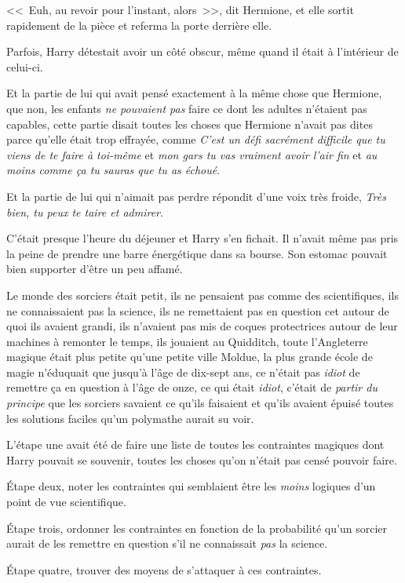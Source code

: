 <<~Euh, au revoir pour l'instant, alors~>>, dit Hermione, et elle sortit rapidement de la pièce et referma la porte derrière elle.

Parfois, Harry détestait avoir un côté obscur, même quand il était à l'intérieur de celui-ci.

Et la partie de lui qui avait pensé exactement à la même chose que Hermione, que non, les enfants \emph{ne pouvaient pas} faire ce dont les adultes n'étaient pas capables, cette partie disait toutes les choses que Hermione n'avait pas dites parce qu'elle était trop effrayée, comme \emph{C'est un défi sacrément difficile que tu viens de te faire à toi-même} et \emph{mon gars tu vas vraiment avoir l'air fin} et \emph{au moins comme ça tu sauras que tu as échoué}.

Et la partie de lui qui n'aimait pas perdre répondit d'une voix très froide, \emph{Très bien, tu peux te taire et admirer}.

\later

C'était presque l'heure du déjeuner et Harry s'en fichait. Il n'avait même pas pris la peine de prendre une barre énergétique dans sa bourse. Son estomac pouvait bien supporter d'être un peu affamé.

Le monde des sorciers était petit, ils ne pensaient pas comme des scientifiques, ils ne connaissaient pas la science, ils ne remettaient pas en question cet autour de quoi ils avaient grandi, ils n'avaient pas mis de coques protectrices autour de leur machines à remonter le temps, ils jouaient au Quidditch, toute l'Angleterre magique était plus petite qu'une petite ville Moldue, la plus grande école de magie n'éduquait que jusqu'à l'âge de dix-sept ans, ce n'était pas \emph{idiot} de remettre ça en question à l'âge de onze, ce qui était \emph{idiot}, c'était de \emph{partir du principe} que les sorciers savaient ce qu'ils faisaient et qu'ils avaient épuisé toutes les solutions faciles qu'un polymathe aurait su voir.

L'étape une avait été de faire une liste de toutes les contraintes magiques dont Harry pouvait se souvenir, toutes les choses qu'on n'était pas censé pouvoir faire.

Étape deux, noter les contraintes qui semblaient être les \emph{moins} logiques d'un point de vue scientifique.

Étape trois, ordonner les contraintes en fonction de la probabilité qu'un sorcier aurait de les remettre en question s'il ne connaissait \emph{pas} la science.

Étape quatre, trouver des moyens de s'attaquer à ces contraintes.

